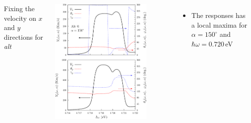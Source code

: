 \documentclass{beamer}
\begin{document}


\begin{frame}

\begin{columns}


\vspace{-3mm}

{\small Fixing the velocity on $x$ and $y$ directions for \emph{alt}}

\vspace{2mm}

\begin{center}

\vspace{-6mm}

\includegraphics[width=0.80\textwidth]{figs/fig9.pdf}

\end{center}  


{\small

\vspace{-2mm}
\begin{itemize}

\item The responses has a local maxima for $\alpha = 150^{\circ}$ and $\hbar
\omega = 0.720$\,eV


\end{itemize}}
\end{columns}
\end{frame}
\end{document}
